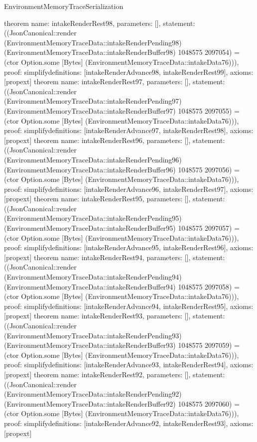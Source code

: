 \begin{lexlean}{EnvironmentMemoryTraceSerialization}
\begin{semanticmodule}
{}
theorem{
 name: intakeRenderRest98, parameters: [],
 statement: ((JsonCanonical::render (EnvironmentMemoryTraceData::intakeRenderPending98) (EnvironmentMemoryTraceData::intakeRenderBuffer98) 1048575 2097054) = (ctor Option.some [Bytes] (EnvironmentMemoryTraceData::intakeData76))), proof: simplify{definitions: [intakeRenderAdvance98, intakeRenderRest99]}, axioms: [propext]
}
theorem{
 name: intakeRenderRest97, parameters: [],
 statement: ((JsonCanonical::render (EnvironmentMemoryTraceData::intakeRenderPending97) (EnvironmentMemoryTraceData::intakeRenderBuffer97) 1048575 2097055) = (ctor Option.some [Bytes] (EnvironmentMemoryTraceData::intakeData76))), proof: simplify{definitions: [intakeRenderAdvance97, intakeRenderRest98]}, axioms: [propext]
}
theorem{
 name: intakeRenderRest96, parameters: [],
 statement: ((JsonCanonical::render (EnvironmentMemoryTraceData::intakeRenderPending96) (EnvironmentMemoryTraceData::intakeRenderBuffer96) 1048575 2097056) = (ctor Option.some [Bytes] (EnvironmentMemoryTraceData::intakeData76))), proof: simplify{definitions: [intakeRenderAdvance96, intakeRenderRest97]}, axioms: [propext]
}
theorem{
 name: intakeRenderRest95, parameters: [],
 statement: ((JsonCanonical::render (EnvironmentMemoryTraceData::intakeRenderPending95) (EnvironmentMemoryTraceData::intakeRenderBuffer95) 1048575 2097057) = (ctor Option.some [Bytes] (EnvironmentMemoryTraceData::intakeData76))), proof: simplify{definitions: [intakeRenderAdvance95, intakeRenderRest96]}, axioms: [propext]
}
theorem{
 name: intakeRenderRest94, parameters: [],
 statement: ((JsonCanonical::render (EnvironmentMemoryTraceData::intakeRenderPending94) (EnvironmentMemoryTraceData::intakeRenderBuffer94) 1048575 2097058) = (ctor Option.some [Bytes] (EnvironmentMemoryTraceData::intakeData76))), proof: simplify{definitions: [intakeRenderAdvance94, intakeRenderRest95]}, axioms: [propext]
}
theorem{
 name: intakeRenderRest93, parameters: [],
 statement: ((JsonCanonical::render (EnvironmentMemoryTraceData::intakeRenderPending93) (EnvironmentMemoryTraceData::intakeRenderBuffer93) 1048575 2097059) = (ctor Option.some [Bytes] (EnvironmentMemoryTraceData::intakeData76))), proof: simplify{definitions: [intakeRenderAdvance93, intakeRenderRest94]}, axioms: [propext]
}
theorem{
 name: intakeRenderRest92, parameters: [],
 statement: ((JsonCanonical::render (EnvironmentMemoryTraceData::intakeRenderPending92) (EnvironmentMemoryTraceData::intakeRenderBuffer92) 1048575 2097060) = (ctor Option.some [Bytes] (EnvironmentMemoryTraceData::intakeData76))), proof: simplify{definitions: [intakeRenderAdvance92, intakeRenderRest93]}, axioms: [propext]
}
\end{semanticmodule}
\end{lexlean}
